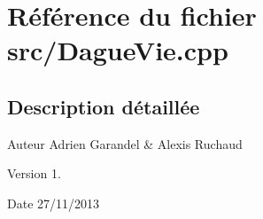\section{Référence du fichier src/\-Dague\-Vie.cpp}
\label{_dague_vie_8cpp}


\subsection{Description détaillée}
\begin{DoxyAuthor}{Auteur}
Adrien Garandel \& Alexis Ruchaud 
\end{DoxyAuthor}
\begin{DoxyVersion}{Version}
1. 
\end{DoxyVersion}
\begin{DoxyDate}{Date}
27/11/2013 
\end{DoxyDate}
